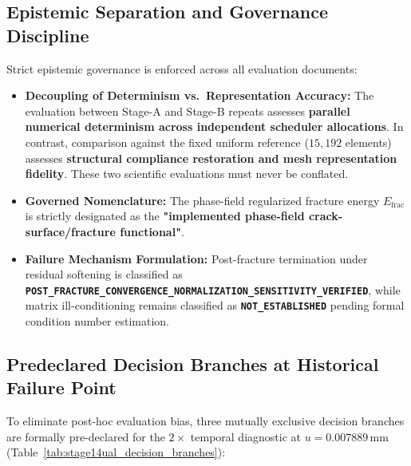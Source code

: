\subsection{Epistemic Separation and Governance Discipline}
\label{subsec:stage14ual_epistemic_governance}

Strict epistemic governance is enforced across all evaluation documents:
\begin{itemize}
  \item \textbf{Decoupling of Determinism vs.\ Representation Accuracy:} The evaluation between Stage-A and Stage-B repeats assesses \textbf{parallel numerical determinism across independent scheduler allocations}. In contrast, comparison against the fixed uniform reference ($15,192$ elements) assesses \textbf{structural compliance restoration and mesh representation fidelity}. These two scientific evaluations must never be conflated.
  \item \textbf{Governed Nomenclature:} The phase-field regularized fracture energy $E_{\mathrm{frac}}$ is strictly designated as the \textbf{"implemented phase-field crack-surface/fracture functional"}.
  \item \textbf{Failure Mechanism Formulation:} Post-fracture termination under residual softening is classified as \textbf{\texttt{POST\_FRACTURE\_CONVERGENCE\_NORMALIZATION\_SENSITIVITY\_VERIFIED}}, while matrix ill-conditioning remains classified as \textbf{\texttt{NOT\_ESTABLISHED}} pending formal condition number estimation.
\end{itemize}

\subsection{Predeclared Decision Branches at Historical Failure Point}
\label{subsec:stage14ual_decision_branches}

To eliminate post-hoc evaluation bias, three mutually exclusive decision branches are formally pre-declared for the $2\times$ temporal diagnostic at $u = 0.007889\,\mathrm{mm}$ (Table~\ref{tab:stage14ual_decision_branches}):


